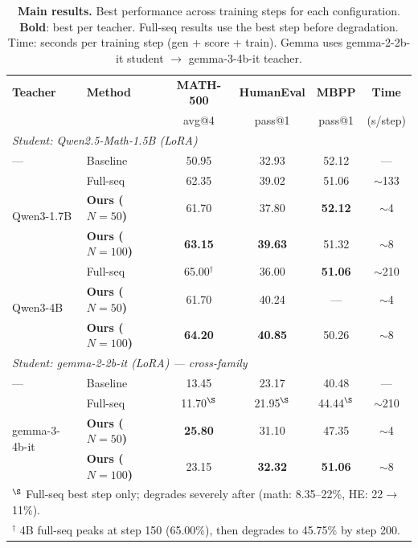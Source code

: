 \documentclass[10pt]{article}
\begin{document}
\begin{table}[t]
\centering
\caption{\textbf{Main results.} Best performance across training steps for each configuration. \textbf{Bold}: best per teacher. Full-seq results use the best step before degradation. Time: seconds per training step (gen + score + train). Gemma uses gemma-2-2b-it student $\rightarrow$ gemma-3-4b-it teacher.}
\label{tab:main_results}
\footnotesize
\begin{tabular}{ll ccc c}
\toprule
\textbf{Teacher} & \textbf{Method} & \textbf{MATH-500} & \textbf{HumanEval} & \textbf{MBPP} & \textbf{Time} \\
 & & avg@4 & pass@1 & pass@1 & (s/step) \\
\midrule
\multicolumn{6}{l}{\textit{Student: Qwen2.5-Math-1.5B (LoRA)}} \\
\midrule
--- & Baseline & 50.95 & 32.93 & 52.12 & --- \\
\midrule
\multirow{3}{*}{Qwen3-1.7B} & Full-seq & 62.35 & 39.02 & 51.06 & ${\sim}$133 \\
 & \textbf{Ours ($N{=}50$)} & 61.70 & 37.80 & \textbf{52.12} & ${\sim}$4 \\
 & \textbf{Ours ($N{=}100$)} & \textbf{63.15} & \textbf{39.63} & 51.32 & ${\sim}$8 \\
\midrule
\multirow{3}{*}{Qwen3-4B} & Full-seq & 65.00$^\dag$ & 36.00 & \textbf{51.06} & ${\sim}$210 \\
 & \textbf{Ours ($N{=}50$)} & 61.70 & 40.24 & --- & ${\sim}$4 \\
 & \textbf{Ours ($N{=}100$)} & \textbf{64.20} & \textbf{40.85} & 50.26 & ${\sim}$8 \\
\midrule
\multicolumn{6}{l}{\textit{Student: gemma-2-2b-it (LoRA) --- cross-family}} \\
\midrule
--- & Baseline & 13.45 & 23.17 & 40.48 & --- \\
\midrule
\multirow{3}{*}{gemma-3-4b-it} & Full-seq & 11.70$^\S$ & 21.95$^\S$ & 44.44$^\S$ & ${\sim}$210 \\
 & \textbf{Ours ($N{=}50$)} & \textbf{25.80} & 31.10 & 47.35 & ${\sim}$4 \\
 & \textbf{Ours ($N{=}100$)} & 23.15 & \textbf{32.32} & \textbf{51.06} & ${\sim}$8 \\
\bottomrule
\multicolumn{6}{l}{\footnotesize $^\S$ Full-seq best step only; degrades severely after (math: 8.35--22\%, HE: 22$\to$11\%).} \\
\multicolumn{6}{l}{\footnotesize $^\dag$ 4B full-seq peaks at step 150 (65.00\%), then degrades to 45.75\% by step 200.}
\end{tabular}
\end{table}
\end{document}

